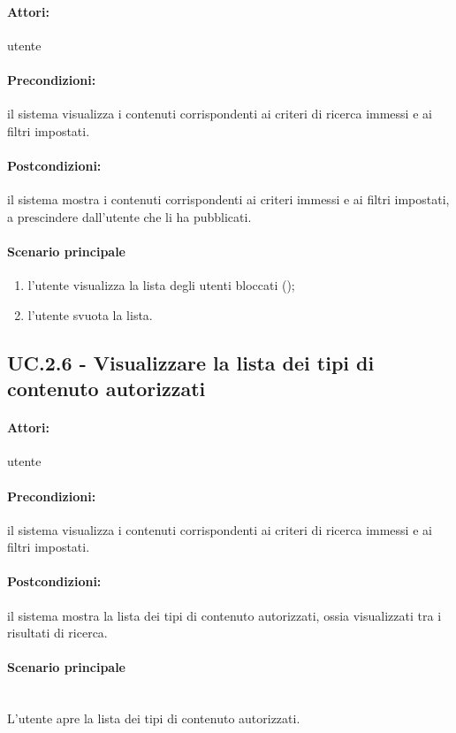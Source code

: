 \documentclass[10pt,a4paper,headinclude,footinclude,hidelinks]{scrreprt} %
\begin{document}
	\paragraph{Attori:} utente
	\paragraph{Precondizioni:} il sistema visualizza i contenuti corrispondenti ai criteri di ricerca immessi e ai filtri impostati.
	\paragraph{Postcondizioni:} il sistema mostra i contenuti corrispondenti ai criteri immessi e ai filtri impostati, a prescindere dall'utente che li ha pubblicati.
	\paragraph{Scenario principale}
	\begin{enumerate}
	\item l'utente visualizza la lista degli utenti bloccati ();
	\item l'utente svuota la lista.
	\end{enumerate}

	\subsection[UC.2.6]{UC.2.6 - Visualizzare la lista dei tipi di contenuto autorizzati}
	\label{sec:stage:ar:uc:2_6}
	\paragraph{Attori:} utente
	\paragraph{Precondizioni:} il sistema visualizza i contenuti corrispondenti ai criteri di ricerca immessi e ai filtri impostati.
	\paragraph{Postcondizioni:} il sistema mostra la lista dei tipi di contenuto autorizzati, ossia visualizzati tra i risultati di ricerca.
	\paragraph{Scenario principale} \hfill \\
	L'utente apre la lista dei tipi di contenuto autorizzati.
\end{document}

